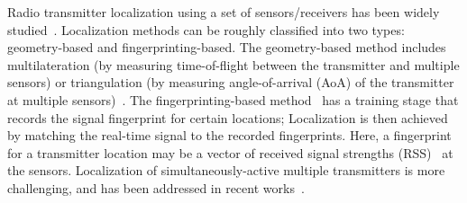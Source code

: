 Radio transmitter localization using a set of sensors/receivers has been
widely studied~\cite{localization-guide, localization-survey, multi-tx-dyspan-19}. 
Localization methods can be roughly classified into two types: geometry-based and fingerprinting-based.
The geometry-based method includes multilateration (by measuring time-of-flight between the transmitter and multiple sensors) or triangulation (by measuring angle-of-arrival (AoA) of the transmitter at multiple sensors)~\cite{nsdi13-arraytrack}.
The fingerprinting-based method~\cite{infocom00-radar} has a training stage that records
the signal fingerprint for certain locations; Localization is then achieved by
matching the real-time signal to the recorded fingerprints. 
Here, a fingerprint for a transmitter location may be a vector of received signal strengths (RSS)~\cite{localization-guide} at the sensors.  
Localization of simultaneously-active multiple transmitters is more challenging,
and has been addressed in recent works~\cite{wowmom21, ipsn20-mtl, pmc22-deepmtlpro}.


